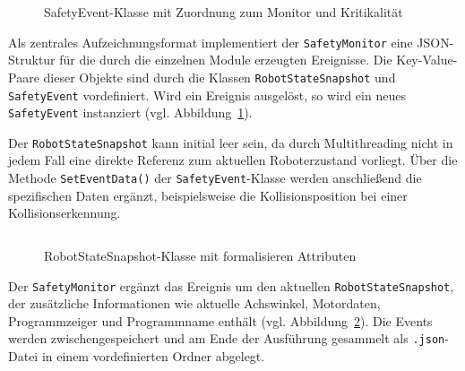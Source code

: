 
\begin{figure}[H]
	\inputminted[fontsize=\footnotesize]{csharp}{code-snippets/SafetyEvent.cs}
	\caption{SafetyEvent-Klasse mit Zuordnung zum Monitor und Kritikalität}
	\label{listing:SafetyEvent}
\end{figure}

Als zentrales Aufzeichnungsformat implementiert der \texttt{SafetyMonitor} eine
JSON-Struktur für die durch die einzelnen Module erzeugten Ereignisse.
Die Key-Value-Paare dieser Objekte sind durch die Klassen
\texttt{RobotStateSnapshot} und \texttt{SafetyEvent} vordefiniert.
Wird ein Ereignis ausgelöst, so wird ein neues \texttt{SafetyEvent} instanziert
(vgl. Abbildung~\ref{listing:SafetyEvent}).

Der \texttt{RobotStateSnapshot} kann initial leer sein, da durch Multithreading
nicht in jedem Fall eine direkte Referenz zum aktuellen Roboterzustand vorliegt.
Über die Methode \texttt{SetEventData()} der \texttt{SafetyEvent}-Klasse werden
anschließend die spezifischen Daten ergänzt, beispielsweise die Kollisionsposition
bei einer Kollisionserkennung.

\begin{figure}[H]
	\inputminted[fontsize=\footnotesize]{csharp}{code-snippets/RobotStateSnapshot.cs}
	\caption{RobotStateSnapshot-Klasse mit formalisieren Attributen}
	\label{listing:RobotStateSnapshot}
\end{figure}

Der \texttt{SafetyMonitor} ergänzt das Ereignis um den aktuellen
\texttt{RobotStateSnapshot}, der zusätzliche Informationen wie aktuelle Achswinkel,
Motordaten, Programmzeiger und Programmname enthält
(vgl. Abbildung~\ref{listing:RobotStateSnapshot}).
Die Events werden zwischengespeichert und am Ende der Ausführung gesammelt
als \texttt{.json}-Datei in einem vordefinierten Ordner abgelegt.


